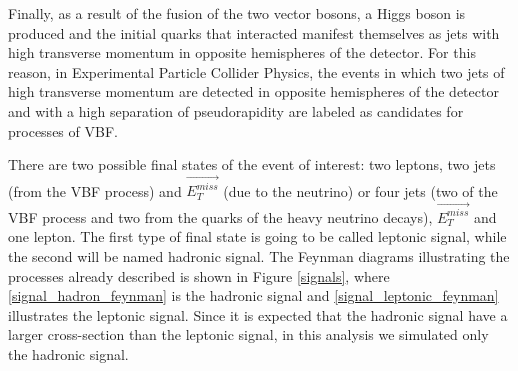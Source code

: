 Finally, as a result of the fusion of the two vector bosons, a Higgs boson is produced and the initial quarks that interacted manifest themselves as jets with high transverse momentum in opposite
hemispheres of the detector. For this reason, in Experimental Particle Collider Physics, the events in which two jets of high transverse momentum are detected in opposite hemispheres of the detector 
and with a high separation of pseudorapidity are labeled as candidates for processes of VBF. 

There are two possible final states of the event of interest: two leptons, two jets (from the VBF process) and $\vec{E_T^{miss}}$ (due to the neutrino) or four jets 
(two of the VBF process and two from the quarks of the heavy neutrino decays), $\vec{E_T^{miss}}$ and one lepton. The first type of final state is going to be called leptonic signal, while the second
will be named hadronic signal. The Feynman diagrams illustrating the processes already described is shown in Figure \ref{signals},
where \ref{signal_hadron_feynman} is the hadronic signal and \ref{signal_leptonic_feynman} illustrates the leptonic signal. Since it is expected that the hadronic signal have a larger cross-section
than the leptonic signal, in this analysis we simulated only the hadronic signal.


